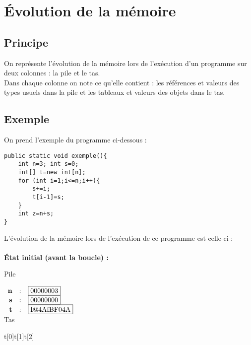 \documentclass[a4paper,10pt]{book} %
\begin{document}
\newpage

\section{Évolution de la mémoire}
\subsection{Principe}
On représente l'évolution de la mémoire lors de l’exécution d'un programme sur deux colonnes : la pile et le tas.\\
Dans chaque colonne on note ce qu'elle contient : les références et valeurs des types usuels dans la pile et les tableaux et valeurs des objets dans le tas.

\subsection{Exemple}
On prend l'exemple du programme ci-dessous :
\begin{lstlisting}
public static void exemple(){
    int n=3; int s=0;
    int[] t=new int[n];
    for (int i=1;i<=n;i++){ 
    	s+=i;
    	t[i-1]=s;
    }
    int z=n+s;
}
\end{lstlisting}

\bigskip\bigskip

L'évolution de la mémoire lors de l’exécution de ce programme est celle-ci :\\\\

\textbf{État initial (avant la boucle) :}

\setlength{\columnseprule}{1pt}
\begin{multicols}{2} \begin{center}
Pile\\
\phantom{a}

$\begin{array}{rcl} \textbf{n} &:& \fbox{00000003}\\
\textbf{s} &:& \fbox{00000000}\\
\textbf{t} &:& \fbox{I@4AfBF04A}
\end{array}$\\

Tas

\phantom{aaaa}t[0]\phantom{aaaaaa}t[1]\phantom{aaaaaa}t[2]\phantom{}

\\

\phantom{a}

\end{center}\end{multicols}
\end{document}

